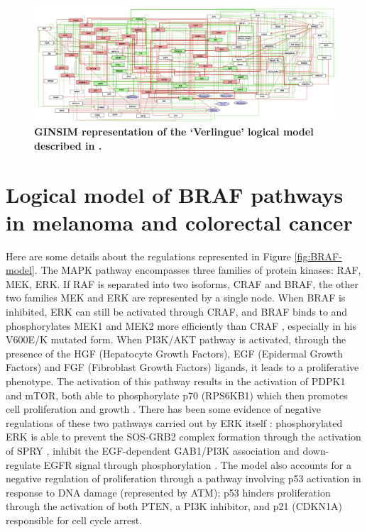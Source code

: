 \documentclass[a4paper,12pt,twoside,onecolumn,openright,final,oldfontcommands]{memoir}
\begin{document}
\begin{figure}

{\centering \includegraphics[width=0.9\linewidth]{fig/Verlingue} 

}

\caption[Graphical abstract of PROFILE method to personalize logical models with omics data]{\textbf{GINSIM representation of the `Verlingue'
logical model described in \citet{verlingue2016silico}.}}\label{fig:Verlingue}
\end{figure}




\section{Logical model of BRAF pathways in melanoma and colorectal
cancer}\label{appendix-pantolini}

Here are some details about the regulations represented in Figure
\ref{fig:BRAF-model}. The MAPK pathway encompasses three families of
protein kinases: RAF, MEK, ERK. If RAF is separated into two isoforms,
CRAF and BRAF, the other two families MEK and ERK are represented by a
single node. When BRAF is inhibited, ERK can still be activated through
CRAF, and BRAF binds to and phosphorylates MEK1 and MEK2 more
efficiently than CRAF \citep{wellbrock2004raf}, especially in his
V600E/K mutated form. When PI3K/AKT pathway is activated, through the
presence of the HGF (Hepatocyte Growth Factors), EGF (Epidermal Growth
Factors) and FGF (Fibroblast Growth Factors) ligands, it leads to a
proliferative phenotype. The activation of this pathway results in the
activation of PDPK1 and mTOR, both able to phosphorylate p70 (RPS6KB1)
which then promotes cell proliferation and growth
\citep{uniprot2019uniprot}. There has been some evidence of negative
regulations of these two pathways carried out by ERK itself
\citep{lake2016negative}: phosphorylated ERK is able to prevent the
SOS-GRB2 complex formation through the activation of SPRY
\citep{edwin2009intermolecular}, inhibit the EGF-dependent GAB1/PI3K
association \citep{lehr2004identification} and down-regulate EGFR signal
through phosphorylation \citep{lake2016negative}. The model also
accounts for a negative regulation of proliferation through a pathway
involving p53 activation in response to DNA damage (represented by ATM);
p53 hinders proliferation through the activation of both PTEN, a PI3K
inhibitor, and p21 (CDKN1A) responsible for cell cycle arrest.
\end{document}
